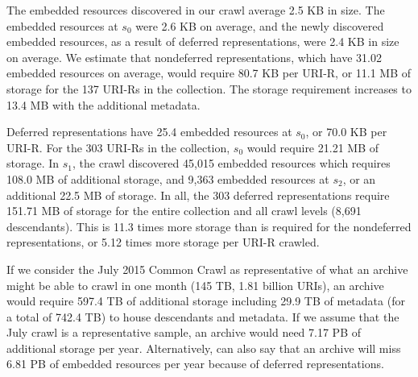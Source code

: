 \documentclass{sig-alternate}
\begin{document}
The embedded resources discovered in our crawl average 2.5 KB in size. The embedded resources at $s_0$ were 2.6 KB on average, and the newly discovered embedded resources, as a result of deferred representations, were 2.4 KB in size on average. We estimate that nondeferred representations, which have 31.02 embedded resources on average, would require 80.7 KB per URI-R, or 11.1 MB of storage for the 137 URI-Rs in the collection. The storage requirement increases to 13.4 MB with the additional metadata.

Deferred representations have 25.4 embedded resources at $s_0$, or 70.0 KB per URI-R. For the 303 URI-Rs in the collection, $s_0$ would require 21.21 MB of storage. In $s_1$, the crawl discovered 45,015 embedded resources which requires 108.0 MB of additional storage, and 9,363 embedded resources at $s_2$, or an additional 22.5 MB of storage. In all, the 303 deferred representations require 151.71 MB of storage for the entire collection and all crawl levels (8,691 descendants). This is 11.3 times more storage than is required for the nondeferred representations, or 5.12 times more storage per URI-R crawled. 

If we consider the July 2015 Common Crawl \cite{iaSize} as representative of what an archive might be able to crawl in one month (145 TB, 1.81 billion URIs), an archive would require 597.4 TB of additional storage including 29.9 TB of metadata (for a total of 742.4 TB) to house descendants and metadata. If we assume that the July crawl is a representative sample, an archive would need 7.17 PB of additional storage per year. Alternatively, can also say that an archive will miss 6.81 PB of embedded resources per year because of deferred representations.
\end{document}

